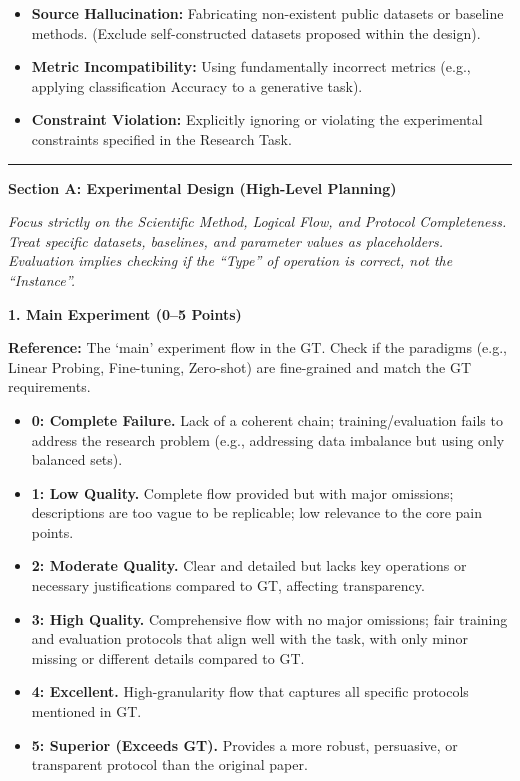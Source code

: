 \begin{tcolorbox}[
	title={Box 7: Full Evaluation Prompt},
	colback=blue!3!white,
	colframe=blue!30!black,
	colbacktitle=blue!15!white,
	coltitle=black,
	fonttitle=\bfseries,
	arc=3mm,
	boxrule=0.8pt,
	breakable
]
\begin{itemize}[nosep,leftmargin=12pt]
	\item \textbf{Source Hallucination:} Fabricating non-existent public datasets or baseline methods. (Exclude self-constructed datasets proposed within the design).
	\item \textbf{Metric Incompatibility:} Using fundamentally incorrect metrics (e.g., applying classification Accuracy to a generative task).
	\item \textbf{Constraint Violation:} Explicitly ignoring or violating the experimental constraints specified in the Research Task.
\end{itemize}

\medskip\hrule\medskip

\textbf{Section A: Experimental Design (High-Level Planning)}

\textit{Focus strictly on the Scientific Method, Logical Flow, and Protocol Completeness. Treat specific datasets, baselines, and parameter values as placeholders. Evaluation implies checking if the ``Type'' of operation is correct, not the ``Instance''.}

\medskip
\textbf{1. Main Experiment (0--5 Points)}

\textbf{Reference:} The `main' experiment flow in the GT. Check if the paradigms (e.g., Linear Probing, Fine-tuning, Zero-shot) are fine-grained and match the GT requirements.

\begin{itemize}[nosep,leftmargin=12pt]
	\item \textbf{0: Complete Failure.} Lack of a coherent chain; training/evaluation fails to address the research problem (e.g., addressing data imbalance but using only balanced sets).
	\item \textbf{1: Low Quality.} Complete flow provided but with major omissions; descriptions are too vague to be replicable; low relevance to the core pain points.
	\item \textbf{2: Moderate Quality.} Clear and detailed but lacks key operations or necessary justifications compared to GT, affecting transparency.
	\item \textbf{3: High Quality.} Comprehensive flow with no major omissions; fair training and evaluation protocols that align well with the task, with only minor missing or different details compared to GT.
	\item \textbf{4: Excellent.} High-granularity flow that captures all specific protocols mentioned in GT.
	\item \textbf{5: Superior (Exceeds GT).} Provides a more robust, persuasive, or transparent protocol than the original paper.
\end{itemize}


\end{tcolorbox}
